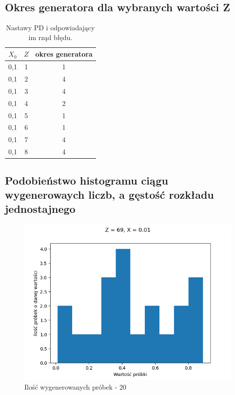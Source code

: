 \documentclass[12pt,a4paper]{article}
\begin{document}
  \subsection{Okres generatora dla wybranych wartości Z}

  \begin{table}[h!]
    \centering
    \begin{tabular}{ c | c | c }
      $X_0$ & $Z$ & okres generatora  \\ 
      \hline
      0,1 & 1 & 1  \\  
      0,1 & 2 & 4  \\  
      0,1 & 3 & 4  \\  
      0,1 & 4 & 2  \\  
      0,1 & 5 & 1  \\
      0,1 & 6 & 1  \\
      0,1 & 7 & 4  \\
      0,1 & 8 & 4 
    \end{tabular}
    \caption{Nastawy PD i odpowiadający im rząd błędu.}
    \label{table:1}
  \end{table}

  \subsection{Podobieństwo histogramu ciągu wygenerowaych liczb, a gęstość rozkładu jednostajnego}


  \begin{figure}[H]
    \centering
    \includegraphics[height=0.25\textheight]{figures/Figure_10.png}
    \caption{Ilość wygenerowanych próbek - 20}
    \label{fig:10}
  \end{figure}
\end{document}

